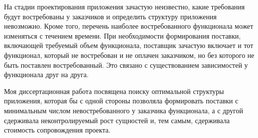 На стадии проектирования приложения зачастую неизвестно, какие требования будут востребованы у заказчиков и определить структуру приложения невозможно. Кроме того, перечень наиболее востребованного функционала может изменяться с течением времени. При необходимости формирования поставки, включающей требуемый объем функционала, поставщик зачастую включает и тот функционал, который не востребован и не оплачен заказчиком, но без которого не быть поставлен востребованный. Это связано с существованием зависимостей у функционала друг на друга.

Моя диссертационная работа посвящена поиску оптимальной структуры приложения, которая бы с одной стороны позволяла формировать поставки с минимальным числом невостребованного у заказчика функционала, а с другой сдерживала неконтролируемый рост сущностей и, тем самым, сдерживала стоимость сопровождения проекта.